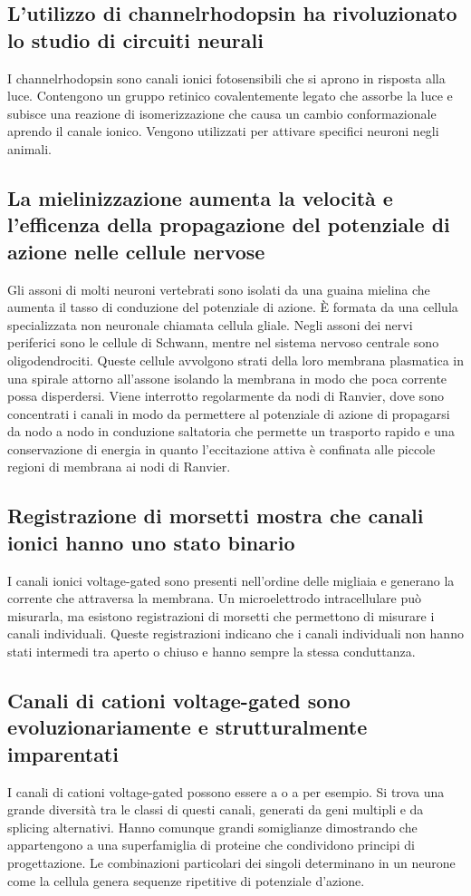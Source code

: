 \subsection{L'utilizzo di channelrhodopsin ha rivoluzionato lo studio di circuiti neurali}
I channelrhodopsin sono canali ionici fotosensibili che si aprono in risposta alla luce. Contengono un gruppo retinico covalentemente legato che assorbe la luce e subisce una 
reazione di isomerizzazione che causa un cambio conformazionale aprendo il canale ionico. Vengono utilizzati per attivare specifici neuroni  negli animali.
\subsection{La mielinizzazione aumenta la velocit\`a e l'efficenza della propagazione del potenziale di azione nelle cellule nervose}
Gli assoni di molti neuroni vertebrati sono isolati da una guaina mielina che aumenta il tasso di conduzione del potenziale di azione. \`E formata da una cellula specializzata non
neuronale chiamata cellula gliale. Negli assoni dei nervi periferici sono le cellule di Schwann, mentre nel sistema nervoso centrale sono oligodendrociti. Queste cellule avvolgono 
strati della loro membrana plasmatica in una spirale attorno all'assone isolando la membrana in modo che poca corrente possa disperdersi. Viene interrotto regolarmente da nodi di
Ranvier, dove sono concentrati i canali  in modo da permettere al potenziale di azione di propagarsi da nodo a nodo in conduzione saltatoria che permette un trasporto rapido
e una conservazione di energia in quanto l'eccitazione attiva \`e confinata alle piccole regioni di membrana ai nodi di Ranvier.
\subsection{Registrazione di morsetti mostra che canali ionici hanno uno stato binario}
I canali ionici voltage-gated sono presenti nell'ordine delle migliaia e generano la corrente che attraversa la membrana. Un microelettrodo intracellulare pu\`o misurarla, ma esistono
registrazioni di morsetti che permettono di misurare i canali individuali. Queste registrazioni indicano che i canali individuali non hanno stati intermedi tra aperto o chiuso e 
hanno sempre la stessa conduttanza. 
\subsection{Canali di cationi voltage-gated sono evoluzionariamente e strutturalmente imparentati}
I canali di cationi voltage-gated possono essere a  o a  per esempio. Si trova una grande diversit\`a tra le classi di questi canali, generati da geni multipli e 
da splicing alternativi. Hanno comunque grandi somiglianze dimostrando che appartengono a una superfamiglia di proteine che condividono principi di progettazione. Le combinazioni
particolari dei singoli determinano in un neurone come la cellula genera sequenze ripetitive di potenziale d'azione.
